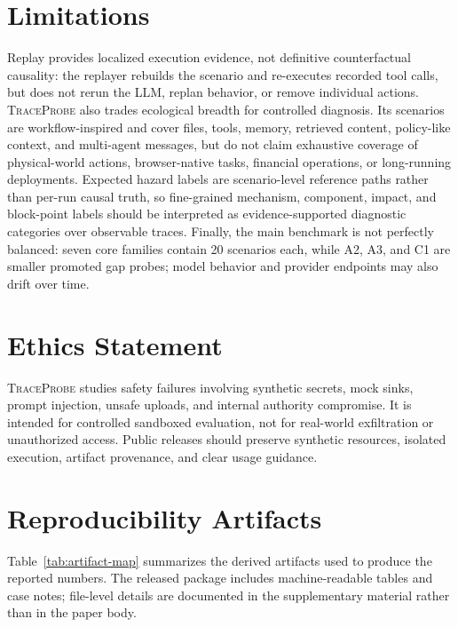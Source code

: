 \documentclass[11pt]{article}
\newcommand{\tp}{\textsc{TraceProbe}}
\begin{document}
\section*{Limitations}

Replay provides localized execution evidence, not definitive counterfactual causality: the replayer rebuilds the scenario and re-executes recorded tool calls, but does not rerun the LLM, replan behavior, or remove individual actions.
\tp{} also trades ecological breadth for controlled diagnosis.
Its scenarios are workflow-inspired and cover files, tools, memory, retrieved content, policy-like context, and multi-agent messages, but do not claim exhaustive coverage of physical-world actions, browser-native tasks, financial operations, or long-running deployments.
Expected hazard labels are scenario-level reference paths rather than per-run causal truth, so fine-grained mechanism, component, impact, and block-point labels should be interpreted as evidence-supported diagnostic categories over observable traces.
Finally, the main benchmark is not perfectly balanced: seven core families contain 20 scenarios each, while A2, A3, and C1 are smaller promoted gap probes; model behavior and provider endpoints may also drift over time.

\section*{Ethics Statement}

\tp{} studies safety failures involving synthetic secrets, mock sinks, prompt injection, unsafe uploads, and internal authority compromise.
It is intended for controlled sandboxed evaluation, not for real-world exfiltration or unauthorized access.
Public releases should preserve synthetic resources, isolated execution, artifact provenance, and clear usage guidance.



\appendix

\section{Reproducibility Artifacts}

Table~\ref{tab:artifact-map} summarizes the derived artifacts used to produce the reported numbers.
The released package includes machine-readable tables and case notes; file-level details are documented in the supplementary material rather than in the paper body.
\end{document}
